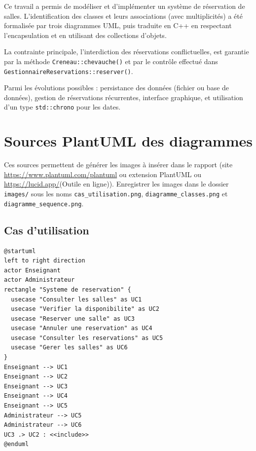 \documentclass[12pt,a4paper]{report}
\begin{document}
Ce travail a permis de modéliser et d'implémenter un système de réservation de
salles. L'identification des classes et leurs associations (avec multiplicités)
a été formalisée par trois diagrammes UML, puis traduite en C++ en respectant
l'encapsulation et en utilisant des collections d'objets.

La contrainte principale, l'interdiction des réservations conflictuelles, est
garantie par la méthode \texttt{Creneau::chevauche()} et par le contrôle effectué
dans \texttt{GestionnaireReservations::reserver()}.

Parmi les évolutions possibles : persistance des données (fichier ou base de
données), gestion de réservations récurrentes, interface graphique, et
utilisation d'un type \texttt{std::chrono} pour les dates.

\appendix
\chapter{Sources PlantUML des diagrammes}

Ces sources permettent de générer les images à insérer dans le rapport (site
\url{https://www.plantuml.com/plantuml} ou extension PlantUML ou \url{https://lucid.app/}(Outile en ligne)). Enregistrer les
images dans le dossier \texttt{images/} sous les noms \texttt{cas\_utilisation.png},
\texttt{diagramme\_classes.png} et \texttt{diagramme\_sequence.png}.

\section{Cas d'utilisation}
\begin{lstlisting}[style=plain]
@startuml
left to right direction
actor Enseignant
actor Administrateur
rectangle "Systeme de reservation" {
  usecase "Consulter les salles" as UC1
  usecase "Verifier la disponibilite" as UC2
  usecase "Reserver une salle" as UC3
  usecase "Annuler une reservation" as UC4
  usecase "Consulter les reservations" as UC5
  usecase "Gerer les salles" as UC6
}
Enseignant --> UC1
Enseignant --> UC2
Enseignant --> UC3
Enseignant --> UC4
Enseignant --> UC5
Administrateur --> UC5
Administrateur --> UC6
UC3 .> UC2 : <<include>>
@enduml
\end{lstlisting}
\end{document}
